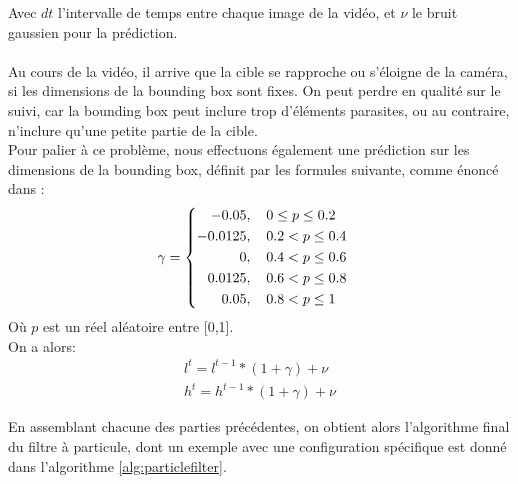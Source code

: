 Avec $dt$ l'intervalle de temps entre chaque image de la vidéo, et $\nu$ le bruit gaussien pour la prédiction.\\
\\
Au cours de la vidéo, il arrive que la cible se rapproche ou s'éloigne de la caméra, si les dimensions de la bounding box sont fixes. On peut perdre en qualité sur le suivi, car la bounding box peut inclure trop d'éléments parasites, ou au contraire, n'inclure qu'une petite partie de la cible.\\
Pour palier à ce problème, nous effectuons également une prédiction sur les dimensions de la bounding box, définit par les formules suivante, comme énoncé dans \cite{kong_particle_2019}:
\begin{equation} \label{eq:gamma}
\gamma=
\begin{cases}
\begin{aligned}
	-0.05,& \hspace{0.4cm}		0 \leq p \leq 0.2\\
    -0.0125,& \hspace{0.4cm}	0.2 < p \leq 0.4\\
    0,& \hspace{0.4cm}			0.4 < p \leq 0.6\\
    0.0125,& \hspace{0.4cm}		0.6 < p \leq 0.8\\
    0.05,& \hspace{0.4cm}		0.8 < p \leq 1
\end{aligned}
\end{cases}
\end{equation}
Où $p$ est un réel aléatoire entre [0,1].\\
On a alors:
\begin{equation} \label{eq:Bbox}
\begin{split}
l^{t} = l^{t-1} * (1+\gamma) + \nu\\
h^{t} = h^{t-1} * (1+\gamma) + \nu
\end{split}
\end{equation}

En assemblant chacune des parties précédentes, on obtient alors l'algorithme final du filtre à particule, dont un exemple avec une configuration spécifique est donné dans l'algorithme \ref{alg:particlefilter}.\\
\vspace{1cm}


